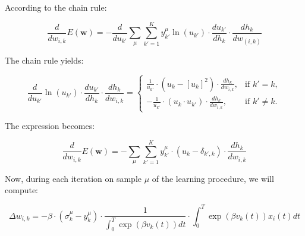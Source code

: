 According to the chain rule:

\begin{equation}
    \frac{d}{dw_{i,k}} E(\mathbf{w}) = -\frac{d}{du_{k'}} \sum_{\mu} \sum_{k'=1}^K y_{k'}^{\mu} \ln(u_{k'}) \cdot \frac{du_{k'}}{dh_k} \cdot \frac{dh_k}{dw_{(i,k)}}
\end{equation}

The chain rule yields:

\begin{equation}
    \frac{d}{du_{k'}} \ln(u_{k'}) \cdot \frac{du_{k'}}{dh_k} \cdot \frac{dh_k}{dw_{i,k}} = \begin{cases}
    \frac{1}{u_{k'}} \cdot (u_k - [u_k]^2) \cdot \frac{dh_k}{dw_{i,k}}, & \text{if } k' = k, \\
    -\frac{1}{u_{k'}} \cdot (u_k \cdot u_{k'}) \cdot \frac{dh_k}{dw_{i,k}}, & \text{if } k' \neq k.
    \end{cases}
\end{equation}

The expression becomes:

\begin{equation}
    \frac{d}{dw_{i,k}} E(\mathbf{w}) = -\sum_{\mu} \sum_{k'=1}^K y_{k'}^{\mu} \cdot (u_k - \delta_{k',k}) \cdot \frac{dh_k}{dw_{i,k}}
\end{equation}

Now, during each iteration on sample \(\mu\) of the learning procedure, we will compute:

\begin{equation}
    \Delta w_{i,k} = -\beta \cdot (\sigma_k^{\mu} - y_k^{\mu}) \cdot \frac{1}{\int_0^T \exp(\beta v_k(t)) dt} \cdot \int_0^T \exp(\beta v_k(t)) x_i(t) dt
\end{equation}
